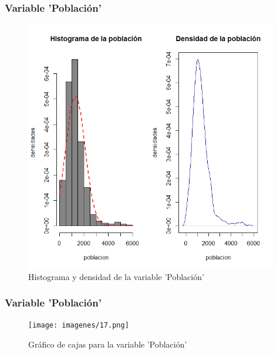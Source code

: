 \documentclass[12pt]{beamer}
\begin{document}
\begin{frame}
\frametitle{Variable 'Población'}
\begin{figure}[!h]
    \begin{center}
        \includegraphics[width=11cm]{imagenes/6.png}
        \caption{Histograma y densidad de la variable 'Población'}
        \label{fig:Densidad}
    \end{center}
\end{figure}
\end{frame}
\begin{frame}
\frametitle{Variable 'Población'}
\begin{figure}[!h]
    \begin{center}
        \texttt{[image: imagenes/17.png]}
        \caption{Gráfico de cajas para la variable 'Población'}
        \label{fig:Densidad}
    \end{center}
\end{figure}
\end{frame}
\end{document}

